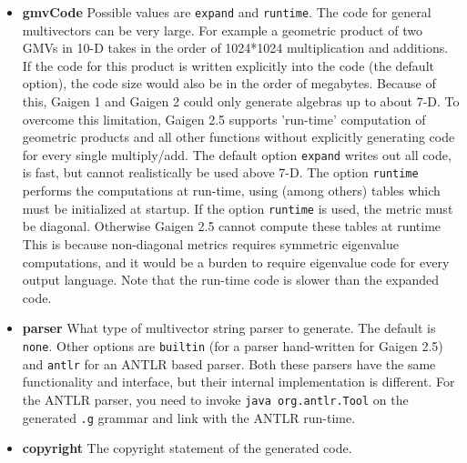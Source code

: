 \documentclass[10pt, a4paper]{article}
\begin{document}
\begin{itemize}
\item {\bf gmvCode} Possible values are {\tt expand} and {\tt runtime}. The code for general multivectors can be very large. For example a geometric product of two GMVs in 10-D 
      takes in the order of 1024*1024 multiplication and additions. If the code for this product is written explicitly into the code (the default option),
      the code size would also be in the order of megabytes. Because of this, Gaigen 1 and Gaigen 2 could only generate algebras up to about 7-D.
      To overcome this limitation, Gaigen 2.5 supports 'run-time' computation of geometric products and all other functions without explicitly generating
      code for every single multiply/add. The default option {\tt expand} writes out all code, is fast, but cannot realistically be used above 7-D. 
      The option {\tt runtime} performs the computations at run-time, using (among others) tables which must be initialized at startup. 
      If the option {\tt runtime} is used, the metric must be diagonal. Otherwise Gaigen 2.5 cannot compute these tables at runtime
      This is because non-diagonal metrics requires symmetric eigenvalue computations, and 
      it would be a burden to require eigenvalue code for every output language. Note that the run-time code is slower than the expanded code.
      
\item {\bf parser} What type of multivector string parser to generate. The default is {\tt none}. Other options are
       {\tt builtin} (for a parser hand-written for Gaigen 2.5) and {\tt antlr} for an ANTLR based parser. Both these parsers have the
       same functionality and interface, but their internal implementation is different. For the ANTLR parser, you need to
       invoke {\tt java org.antlr.Tool} on the generated {\tt .g} grammar and link with the ANTLR run-time.
       
\item {\bf copyright} The copyright statement of the generated code.
\end{itemize}
 
\end{document}
